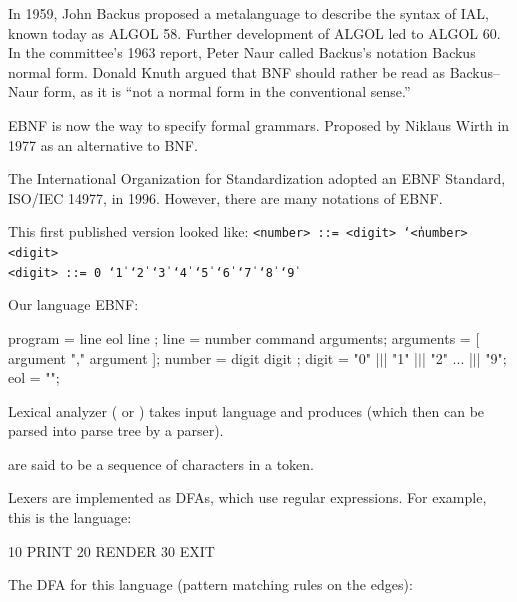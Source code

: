 \documentclass{article}
\begin{document}

\pptToc


In 1959, John Backus proposed a metalanguage to describe the syntax of IAL, known today as ALGOL 58. Further development of ALGOL led to ALGOL 60. In the committee's 1963 report, Peter Naur called Backus's notation Backus normal form. Donald Knuth argued that BNF should rather be read as Backus–Naur form, as it is ``not a normal form in the conventional sense.''

EBNF is now the way to specify formal grammars. Proposed by Niklaus Wirth in 1977 as an alternative to BNF.

The International Organization for Standardization adopted an EBNF Standard, ISO/IEC 14977, in 1996. However, there are many notations of EBNF.
\plush{}

This first published version looked like:
\texttt{<number> ::= <digit> \char`\| <number> <digit> \\
<digit> ::= 0 \char`\| 1 \char`\| 2 \char`\| 3 \char`\| 4 \char`\| 5 \char`\| 6 \char`\| 7 \char`\| 8 \char`\| 9}
\plush{}

Our language EBNF:
\begin{ffcode}
program = line { eol line };
line = number command arguments;
arguments = [ argument { "," argument } ];
number = digit { digit };
digit = "0" |$\vert$| "1" |$\vert$| "2" ... |$\vert$| "9";
eol = "\n";
\end{ffcode}
\plush{}


Lexical analyzer ( or ) takes input language and produces  (which then can be parsed into parse tree by a parser).

 are said to be a sequence of characters in a token.
\plush{}

Lexers are implemented as DFAs, which use regular expressions. For example, this is the language:
\begin{ffcode}
10 PRINT
20 RENDER
30 EXIT
\end{ffcode}
\plush{}

The DFA for this language (pattern matching rules on the edges): \\
\end{document}
